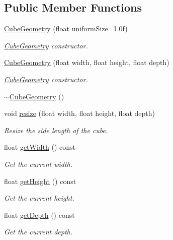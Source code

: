 \subsection*{Public Member Functions}
\begin{DoxyCompactItemize}
\item 
\mbox{\hyperlink{classec_1_1_cube_geometry_a539617a3a7e98e1a09af01e2328bac30}{Cube\+Geometry}} (float uniform\+Size=1.\+0f)
\begin{DoxyCompactList}\small\item\em \mbox{\hyperlink{classec_1_1_cube_geometry}{Cube\+Geometry}} constructor. \end{DoxyCompactList}\item 
\mbox{\hyperlink{classec_1_1_cube_geometry_ac4ffe05d266c00e8e337233c4c48d29f}{Cube\+Geometry}} (float width, float height, float depth)
\begin{DoxyCompactList}\small\item\em \mbox{\hyperlink{classec_1_1_cube_geometry}{Cube\+Geometry}} constructor. \end{DoxyCompactList}\item 
\mbox{\hyperlink{classec_1_1_cube_geometry_a8e8e46246b76cdf551d59d3f5c32d88d}{$\sim$\+Cube\+Geometry}} ()
\item 
void \mbox{\hyperlink{classec_1_1_cube_geometry_a627e0b292fee9b9c746c4ac221d167b6}{resize}} (float width, float height, float depth)
\begin{DoxyCompactList}\small\item\em Resize the side length of the cube. \end{DoxyCompactList}\item 
float \mbox{\hyperlink{classec_1_1_cube_geometry_ab164f9799b3590dc2f8328480094ca38}{get\+Width}} () const
\begin{DoxyCompactList}\small\item\em Get the current width. \end{DoxyCompactList}\item 
float \mbox{\hyperlink{classec_1_1_cube_geometry_a43599cbf63a2c285a2b08c5eee7ad5b8}{get\+Height}} () const
\begin{DoxyCompactList}\small\item\em Get the current height. \end{DoxyCompactList}\item 
float \mbox{\hyperlink{classec_1_1_cube_geometry_a15f5d4813e4ffa6d149d11ea711294d8}{get\+Depth}} () const
\begin{DoxyCompactList}\small\item\em Get the current depth. \end{DoxyCompactList}\end{DoxyCompactItemize}
